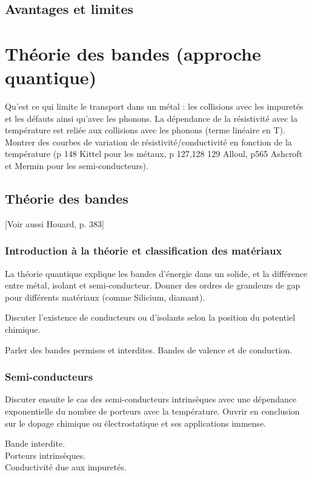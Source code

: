 \documentclass[11pt]{report}
\numberwithin{figure}{section}
\numberwithin{equation}{section}
\numberwithin{table}{section}
\newcommand{\1}{\boldsymbol{1}}
\begin{document}
\subsection{Avantages et limites}


\section{Théorie des bandes (approche quantique)}


Qu'est ce qui limite le transport dans un métal : les collisions avec les impuretés et les défauts ainsi qu'avec les phonons. La dépendance de la résistivité avec la température est reliée aux collisions
avec les phonons (terme linéaire en T).
Montrer des courbes de variation de résistivité/conductivité en fonction de la température (p 148 Kittel pour les métaux, p 127,128 129 Alloul, p565 Ashcroft et
Mermin pour les semi-conducteurs).



\subsection{Théorie des bandes}

[Voir aussi Houard, p. 383]

\subsubsection{Introduction à la théorie et classification des matériaux}

La théorie quantique explique les
bandes d'énergie dans un solide, et la
différence entre métal, isolant et semi-conducteur. Donner des ordres de grandeurs de gap pour différents matériaux
(comme Silicium, diamant).

Discuter l'existence de conducteurs ou d'isolants selon la position du potentiel chimique.

Parler des bandes permises et interdites. Bandes de valence et de conduction.

\subsubsection{Semi-conducteurs}

Discuter ensuite le cas des semi-conducteurs intrinsèques avec une dépendance
exponentielle du nombre de porteurs avec la température. Ouvrir en conclusion sur le dopage chimique ou électrostatique et ses applications immense.

Bande interdite. \\
Porteurs intrinsèques.\\
Conductivité due aux impuretés.
\end{document}
